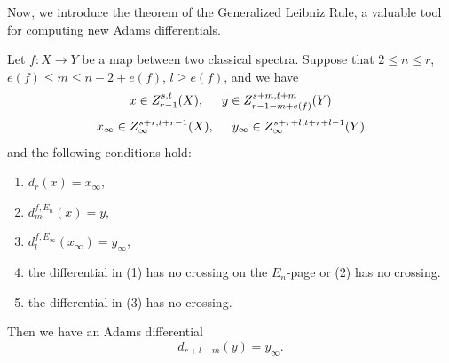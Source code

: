 \documentclass{amsart}
\numberwithin{equation}{section}
\begin{document}
Now, we introduce the theorem of the Generalized Leibniz Rule, a valuable tool for computing new Adams differentials.

\begin{theorem}\label{thm:e73f481e}
    Let $f: X\to Y$ be a map between two classical spectra.
    Suppose that $2\le n\le r$, $e(f)\le m\le n-2+e(f)$, $l\ge e(f)$, and we have
    $$x\in Z_{r-1}^{s,t}(X), \hspace{0.5cm} y\in Z_{r-1-m+e(f)}^{s+m,t+m}(Y)$$
    $$x_\infty\in Z_\infty^{s+r,t+r-1}(X), \hspace{0.5cm} y_\infty\in Z_\infty^{s+r+l,t+r+l-1}(Y)$$
    and the following conditions hold:
    \begin{enumerate}
        \item $d_{r}(x)=x_\infty$,
        \item $d_{m}^{f,E_n}(x)=y$,
        \item $d_{l}^{f,E_\infty}(x_\infty)=y_\infty$,
        \item the differential in (1) has no crossing on the $E_n$-page or (2) has no crossing.
        \item the differential in (3) has no crossing.%
    \end{enumerate}
    Then we have an Adams differential
    $$d_{r+l-m}(y)= y_\infty.$$
\end{theorem}
\end{document}
